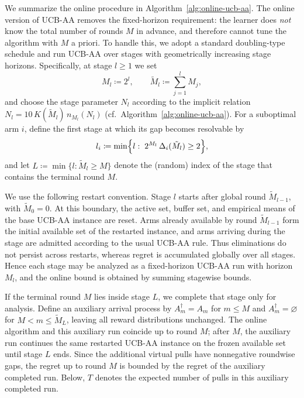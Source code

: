 \documentclass[
  12pt]{article}
\begin{document}
We summarize the online procedure in Algorithm~\ref{alg:online-ucb-aa}. The online version of UCB-AA removes the fixed-horizon requirement: the learner does \emph{not} know the total number of rounds $M$ in advance, and therefore cannot tune the algorithm with $M$ a priori. To handle this, we adopt a standard doubling-type schedule and run UCB-AA over stages with geometrically increasing stage horizons. Specifically, at stage $l\ge 1$ we set
\[
M_l \coloneqq 2^l,
\qquad
\tilde{M}_l \coloneqq \sum_{j=1}^l M_j,
\]
and choose the stage parameter $N_l$ according to the implicit relation $N_l=10\,K(\tilde{M}_l)\,n_{M_l}(N_l)$ (cf.\ Algorithm~\ref{alg:online-ucb-aa}). For a suboptimal arm $i$, define the first stage at which its gap becomes resolvable by
\[
l_i \coloneqq \min\Bigl\{l:\; 2^{M_l}\,\Delta_i(\tilde{M}_l)\ge 2\Bigr\},
\]
and let $L \coloneqq \min\{l:\tilde{M}_l\ge M\}$ denote the (random) index of the stage that contains the terminal round $M$.

We use the following restart convention. Stage \(l\) starts after global round
\(\tilde M_{l-1}\), with \(\tilde M_0=0\). At this boundary, the active set,
buffer set, and empirical means of the base UCB-AA instance are reset. Arms
already available by round \(\tilde M_{l-1}\) form the initial available set of
the restarted instance, and arms arriving during the stage are admitted according
to the usual UCB-AA rule. Thus eliminations do not persist across restarts,
whereas regret is accumulated globally over all stages. Hence each stage may be
analyzed as a fixed-horizon UCB-AA run with horizon \(M_l\), and the online
bound is obtained by summing stagewise bounds.

If the terminal round \(M\) lies inside stage \(L\), we complete that stage only
for analysis. Define an auxiliary arrival process by
\(A_m^\dagger=A_m\) for \(m\le M\) and
\(A_m^\dagger=\varnothing\) for \(M<m\le \tilde M_L\), leaving all reward
distributions unchanged. The online algorithm and this auxiliary run coincide
up to round \(M\); after \(M\), the auxiliary run continues the same restarted
UCB-AA instance on the frozen available set until stage \(L\) ends. Since the
additional virtual pulls have nonnegative roundwise gaps, the regret up to
round \(M\) is bounded by the regret of the auxiliary completed run. Below,
\(T\) denotes the expected number of pulls in this auxiliary completed run.
\end{document}
